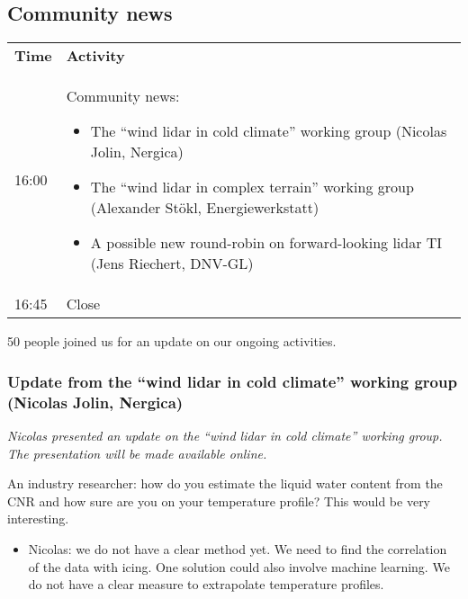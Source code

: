 \subsection{Community news}

\begin{table}[!h]
  \centering
  \begin{tabular}{@{}|p{}|p{}|@{}}
  \rowcolor{Task32Blue2} \textbf{Time} & \textbf{Activity} \\  
  16:00 & Community news:
    \begin{itemize}
      \item The \enquote{wind lidar in cold climate} working group (Nicolas Jolin, Nergica)
      \item The \enquote{wind lidar in complex terrain} working group (Alexander Stökl, Energiewerkstatt)
      \item A possible new round-robin on forward-looking lidar TI (Jens Riechert, DNV-GL)
    \end{itemize}\\
  16:45 & Close \\
  \end{tabular}
  \label{tab:day2-community-news-agenda}
\end{table}

50 people joined us for an update on our ongoing activities.

\subsubsection[Update from the \enquote{wind lidar in cold climate} working group]{Update from the \enquote{wind lidar in cold climate} working group (Nicolas Jolin, Nergica)}

\emph{Nicolas presented an update on the \enquote{wind lidar in cold climate} working group. The presentation will be made available online.}

An industry researcher: how do you estimate the liquid water content from the CNR and how sure are you on your temperature profile? This would be very interesting.

\begin{itemize}
\item Nicolas: we do not have a clear method yet. We need to find the   correlation of the data with icing. One solution could also involve machine learning. We do not have a clear measure to extrapolate temperature profiles.
\end{itemize}

